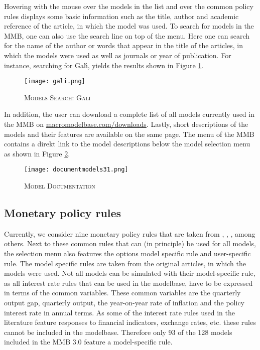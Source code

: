 Hovering with the mouse over the models in the list and over the common policy rules displays some basic information such as the title, author and academic reference of the article, in which the model was used. To search for models in the MMB, one can also use the search line on top of the menu. Here one can search for the name of the author or words that appear in the title of the articles, in which the models were used as well as journals or year of publication. For instance, searching for Gal{\'\i}, yields the results shown in Figure \ref{search}.

\begin{figure}[H]
	\centering
	\caption{\textsc{Models Search: Gal{\'\i}}}
	\vspace{0.2cm}
	\texttt{[image: gali.png]}\\
	\label{search}
\end{figure}

In addition, the user can download a complete list of all models currently used in the MMB on \url{macromodelbase.com/downloads}. Lastly, short descriptions of the models and their features are available on the same page. The menu of the MMB contains a direkt link to the model descriptions below the model selection menu as shown in Figure \ref{docmod}.
\begin{figure}[H]
	\centering
	\caption{\textsc{Model Documentation}}
	\vspace{0.2cm}
	\texttt{[image: documentmodels31.png]}\\
	\label{docmod}
\end{figure}

\subsection*{Monetary policy rules}



Currently, we consider nine monetary policy rules that are taken from \cite{Taylor1993}, \cite{LevinWielandWilliams2003}, \cite{SmetsWouters2007}, among others. Next to these common rules that can (in principle) be used for all models, the selection menu also features the options model specific rule and user-specific rule. 
The model specific rules are taken from the original articles, in which the models were used. Not all models can be simulated with their model-specific rule, as all interest rate rules that can be used in the modelbase, have to be expressed in terms of the common variables. These common variables are the quarterly output gap, quarterly output, the year-on-year rate of inflation and the policy interest rate in annual terms. As some of the interest rate rules used in the literature feature responses to financial indicators, exchange rates, etc. these rules cannot be included in the modelbase. Therefore only 93 of the 128 models included in the MMB 3.0 feature a model-specific rule. %

